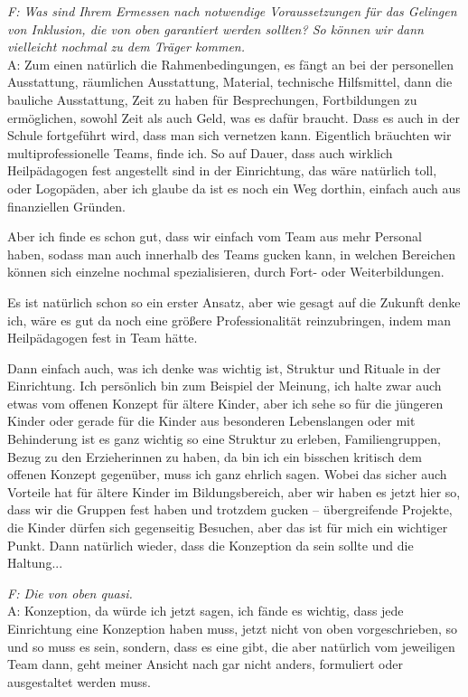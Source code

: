 \begin{linenumbers*}
\emph{F: Was sind Ihrem Ermessen nach notwendige Voraussetzungen für das Gelingen von Inklusion, die von oben garantiert werden sollten? So können wir dann vielleicht nochmal zu dem Träger kommen.}\\
A: Zum einen natürlich die Rahmenbedingungen, es fängt an bei der personellen Ausstattung, räumlichen Ausstattung, Material, technische Hilfsmittel, dann die bauliche Ausstattung, Zeit zu haben für Besprechungen, Fortbildungen zu ermöglichen, sowohl Zeit als auch Geld, was es dafür braucht. Dass es auch in der Schule fortgeführt wird, dass man sich vernetzen kann.
Eigentlich bräuchten wir multiprofessionelle Teams, finde ich. So auf Dauer, dass auch wirklich Heilpädagogen fest angestellt sind in der Einrichtung, das wäre natürlich toll, oder Logopäden, aber ich glaube da ist es noch ein Weg dorthin, einfach auch aus finanziellen Gründen. 

Aber ich finde es schon gut, dass wir einfach vom Team aus mehr Personal haben, sodass man auch innerhalb des Teams gucken kann, in welchen Bereichen können sich einzelne nochmal spezialisieren, durch Fort- oder Weiterbildungen.  

Es ist natürlich schon so ein erster Ansatz, aber wie gesagt auf die Zukunft denke ich, wäre es gut da noch eine größere Professionalität reinzubringen, indem man Heilpädagogen fest in Team hätte.   

Dann einfach auch, was ich denke was wichtig ist, Struktur und Rituale in der Einrichtung. Ich persönlich bin zum Beispiel der Meinung, ich halte zwar auch etwas vom offenen Konzept für ältere Kinder, aber ich sehe so für die jüngeren Kinder oder gerade für die  Kinder aus besonderen Lebenslangen oder mit Behinderung ist es ganz wichtig so eine Struktur zu erleben, Familiengruppen, Bezug zu den Erzieherinnen zu haben, da bin ich ein bisschen kritisch dem offenen Konzept gegenüber, muss ich ganz ehrlich sagen. Wobei das sicher auch Vorteile hat für ältere Kinder im Bildungsbereich, aber wir haben es jetzt hier so, dass wir die Gruppen fest haben und trotzdem gucken – übergreifende Projekte, die Kinder dürfen sich gegenseitig Besuchen, aber das ist für mich ein wichtiger Punkt. Dann natürlich wieder, dass die Konzeption da sein sollte und die Haltung... 

\emph{F: Die von oben quasi.}\\
A: Konzeption, da würde ich jetzt sagen, ich fände es wichtig, dass jede Einrichtung eine Konzeption haben muss, jetzt nicht von oben vorgeschrieben, so und so muss es sein, sondern, dass es eine gibt, die aber natürlich vom jeweiligen Team dann, geht meiner Ansicht nach gar nicht anders, formuliert oder ausgestaltet werden muss.  


\end{linenumbers*}
